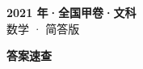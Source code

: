 \documentclass[zihao=-4, a4paper]{ctexart}
\begin{document}
\begin{center}
  {\Large\bfseries 2021 年·全国甲卷·文科}\\[4pt]
  {\large 数学 · 简答版}
\end{center}
\medskip
{}

\clearpage
{}
\begin{center}{\Large\bfseries 答案速查}\end{center}
\medskip

\end{document}
